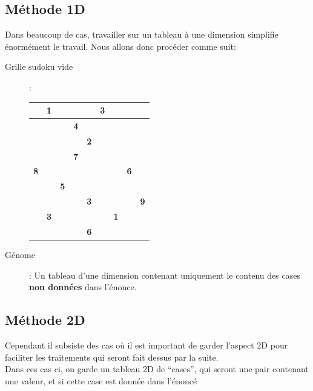             \subsection{Méthode 1D}
                Dans beaucoup de cas, travailler sur un tableau à une dimension simplifie énormément le travail. Nous allons donc procéder comme suit:
                \begin{description}
                    \item[Grille sudoku vide]:\\
                        \begin{center}
                            \begin{tabular}{|c|c|c| |c|c|c| |c|c|c|}
                                \hline
                                &\textbf{1}&&&&\textbf{3}&&&\\
                                \hline
                                &&&\textbf{4}&&&&&\\
                                \hline
                                &&&&\textbf{2}&&&&\\
                                \hline
                                \hline
                                &&&\textbf{7}&&&&&\\
                                \hline
                                \textbf{8}&&&&&&&\textbf{6}&\\
                                \hline
                                &&\textbf{5}&&&&&&\\
                                \hline
                                \hline
                                &&&&\textbf{3}&&&&\textbf{9}\\
                                \hline
                                &\textbf{3}&&&&&\textbf{1}&&\\
                                \hline
                                &&&&\textbf{6}&&&&\\
                                \hline
                            \end{tabular}
                        \end{center}
                    \item[G\'enome]: Un tableau d'une dimension contenant uniquement le contenu des cases \textbf{non données} dans l'énonce.
                \end{description}
            \subsection{Méthode 2D}
                Cependant il subsiste des cas où il est important de garder l'aspect 2D pour faciliter les traitements qui seront fait dessus par la suite.\\
                Dans ces cas ci, on garde un tableau 2D de ``cases'', qui seront une pair contenant une valeur, et si cette case est donnée dans l'énoncé
